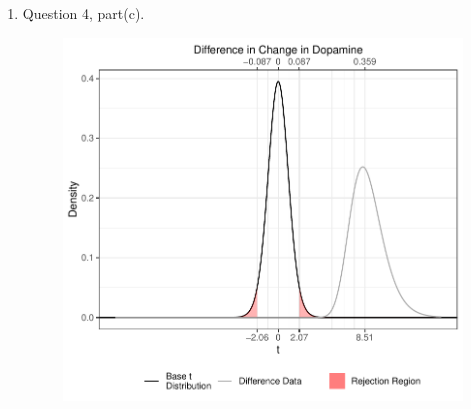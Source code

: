 \documentclass{article}\usepackage[]{graphicx}\usepackage[]{xcolor}
\begin{document}
\begin{enumerate}
\begin{enumerate}
\pagebreak    

  \item Question 4, part(c).
  \begin{figure}[ht]
    \centering
    \includegraphics[scale = 0.5]{tdiff.pdf}
    \end{figure}
\end{enumerate}
\end{enumerate}



\end{document}
